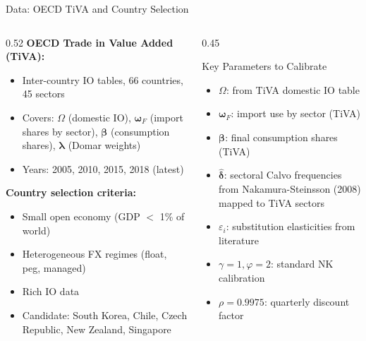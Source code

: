 \documentclass[aspectratio=169]{beamer}
\begin{document}
\begin{frame}{Data: OECD TiVA and Country Selection}

\begin{columns}
\begin{column}{0.52\textwidth}
\textbf{OECD Trade in Value Added (TiVA):}
\begin{itemize}
    \item Inter-country IO tables, 66 countries, 45 sectors
    \item Covers: $\Omega$ (domestic IO), $\bm{\omega}_F$ (import shares by sector), $\bm{\beta}$ (consumption shares), $\bm{\lambda}$ (Domar weights)
    \item Years: 2005, 2010, 2015, 2018 (latest)
\end{itemize}

\vspace{0.3cm}
\textbf{Country selection criteria:}
\begin{itemize}
    \item Small open economy (GDP $<$ 1\% of world)
    \item Heterogeneous FX regimes (float, peg, managed)
    \item Rich IO data
    \item Candidate: South Korea, Chile, Czech Republic, New Zealand, Singapore
\end{itemize}
\end{column}
\begin{column}{0.45\textwidth}
\begin{block}{Key Parameters to Calibrate}
\begin{itemize}
    \item $\Omega$: from TiVA domestic IO table
    \item $\bm{\omega}_F$: import use by sector (TiVA)
    \item $\bm{\beta}$: final consumption shares (TiVA)
    \item $\hat{\bm{\delta}}$: sectoral Calvo frequencies from Nakamura-Steinsson (2008) mapped to TiVA sectors
    \item $\varepsilon_i$: substitution elasticities from literature
    \item $\gamma=1, \varphi=2$: standard NK calibration
    \item $\rho = 0.9975$: quarterly discount factor
\end{itemize}
\end{block}
\end{column}
\end{columns}
\end{frame}
\end{document}

